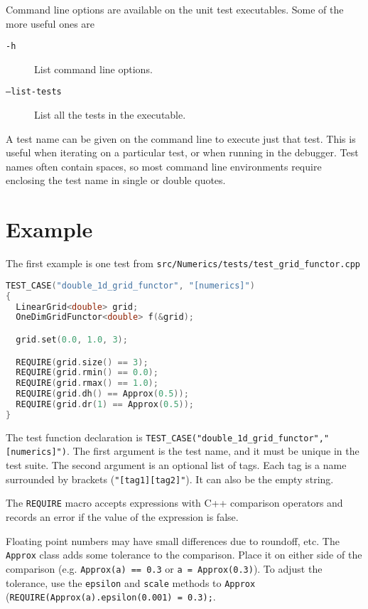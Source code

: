 Command line options are available on the unit test executables.  Some of the more useful ones are
\begin{description}
\item[\texttt{-h}]  List command line options.
\item [\texttt{--list-tests}] List all the tests in the executable.
\end{description}

A test name can be given on the command line to execute just that test.  This is useful when iterating
on a particular test, or when running in the debugger.   Test names often contain spaces, so most command line environments require enclosing the test name in single or double quotes.



\section{Example}

The first example is one test from \texttt{src/Numerics/tests/test\_grid\_functor.cpp}

\begin{minipage}{\linewidth}
\begin{lstlisting}[language=C++,caption={Unit test example using Catch},label=CatchExample,basicstyle=\ttfamily]
TEST_CASE("double_1d_grid_functor", "[numerics]")
{
  LinearGrid<double> grid;
  OneDimGridFunctor<double> f(&grid);

  grid.set(0.0, 1.0, 3);

  REQUIRE(grid.size() == 3);
  REQUIRE(grid.rmin() == 0.0);
  REQUIRE(grid.rmax() == 1.0);
  REQUIRE(grid.dh() == Approx(0.5));
  REQUIRE(grid.dr(1) == Approx(0.5));
}
\end{lstlisting}
\end{minipage}

The test function declaration is
\texttt{TEST\_CASE("double\_1d\_grid\_functor","[numerics]")}.
The first argument is the test name, and it must be unique in the test suite.
The second argument is an optional list of tags.  Each tag is a name surrounded by brackets (\texttt{"[tag1][tag2]"}).  It can also be the empty string.

The \texttt{REQUIRE} macro accepts expressions with C++ comparison operators and records an error if the value of the expression is false.

Floating point numbers may have small differences due to roundoff, etc.   The \texttt{Approx} class adds some tolerance to the comparison.  Place it on either side of the comparison (e.g. \texttt{Approx(a) == 0.3} or \texttt{a = Approx(0.3)}).   To adjust the tolerance, use the \texttt{epsilon} and \texttt{scale} methods to \texttt{Approx} (\texttt{REQUIRE(Approx(a).epsilon(0.001) = 0.3);}.

